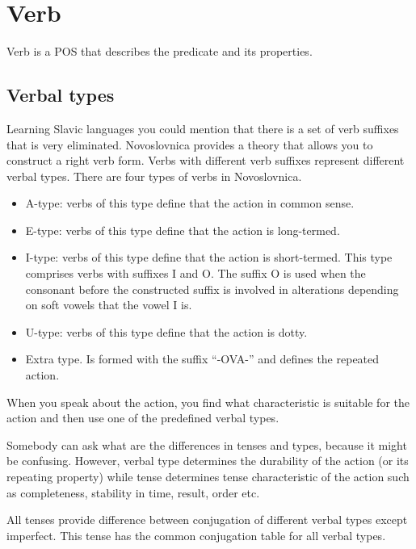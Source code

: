 \section{Verb}

Verb is a POS that describes the predicate and its properties. 


\subsection{Verbal types}

Learning Slavic languages you could mention that there is a set of verb suffixes that is very eliminated. Novoslovnica provides a theory that allows you to construct a right verb form.
Verbs with different verb suffixes represent different verbal types. There are four types of verbs in Novoslovnica.

\begin{itemize}
	\item A-type: verbs of this type define that the action in common sense.  
	\item E-type: verbs of this type define that the action is long-termed.
	\item I-type: verbs of this type define that the action is short-termed. This type comprises verbs with suffixes I and O. The suffix O is used when the consonant before the constructed suffix is involved in alterations depending on soft vowels that the vowel I is.
	\item U-type: verbs of this type define that the action is dotty.
	\item Extra type. Is formed with the suffix “-OVA-” and defines the repeated action.  
\end{itemize}

When you speak about the action, you find what characteristic is suitable for the action and then use one of the predefined verbal types.

Somebody can ask what are the differences in tenses and types, because it might be confusing. However, verbal type determines the durability of the action (or its repeating property) while tense determines tense characteristic of the action such as completeness, stability in time, result, order etc.

All tenses provide difference between conjugation of different verbal types except imperfect. This tense has the common conjugation table for all verbal types. 

